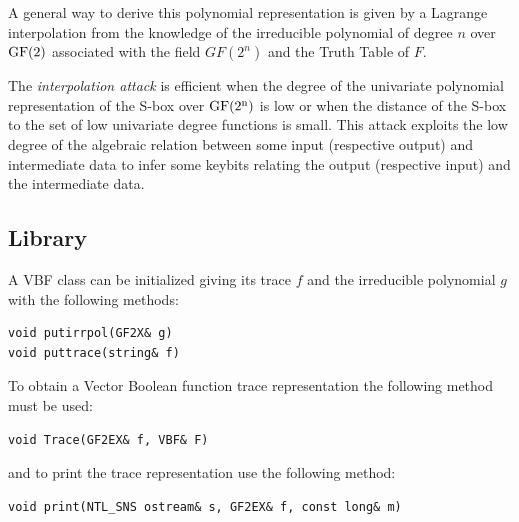 A general way to derive this polynomial representation is given by a Lagrange interpolation from the knowledge of the irreducible polynomial of degree $n$ over $\gf{GF(2)}$ associated with the field $GF(2^n)$ and the Truth Table of $F$.

The \textit{interpolation attack} \cite{JakobsenK:97} is efficient when the degree of the univariate polynomial representation of the S-box over $\gf{GF(2^n)}$ is low or when the distance of the S-box to the set of low univariate degree functions is small. This attack exploits the low degree of the algebraic relation between some input (respective output)
  and intermediate data to infer some keybits relating the output (respective input) and the intermediate data.

\subsection{Library}

A VBF class can be initialized giving its trace $f$ and the irreducible polynomial $g$ with the following methods:

\begin{verbatim}
void putirrpol(GF2X& g)
void puttrace(string& f)
\end{verbatim}

To obtain a Vector Boolean function trace representation the following method must be used:

\begin{verbatim}
void Trace(GF2EX& f, VBF& F)
\end{verbatim}

and to print the trace representation use the following method:

\begin{verbatim}
void print(NTL_SNS ostream& s, GF2EX& f, const long& m)
\end{verbatim}

